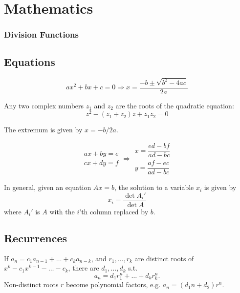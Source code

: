 
\chapter{Mathematics}
\subsection{Division Functions}

\section{Equations}
\[ax^2+bx+c=0 \Rightarrow x = \frac{-b\pm\sqrt{b^2-4ac}}{2a}\]

Any two complex numbers $z_1$ and $z_2$ are the roots of the quadratic equation:
\[z^2 - (z_1 + z_2)z + z_1 z_2 = 0\]

The extremum is given by $x = -b/2a$.

\[\begin{aligned}ax+by=e\\cx+dy=f\end{aligned}
\Rightarrow
\begin{aligned}x=\dfrac{ed-bf}{ad-bc}\\y=\dfrac{af-ec}{ad-bc}\end{aligned}\]

In general, given an equation $Ax = b$, the solution to a variable $x_i$ is given by
\[x_i = \frac{\det A_i'}{\det A} \]
where $A_i'$ is $A$ with the $i$'th column replaced by $b$.

\section{Recurrences}
If $a_n = c_1 a_{n-1} + \dots + c_k a_{n-k}$, and $r_1, \dots, r_k$ are distinct roots of $x^k - c_1 x^{k-1} - \dots - c_k$, there are $d_1, \dots, d_k$ s.t.
\[a_n = d_1r_1^n + \dots + d_kr_k^n. \]
Non-distinct roots $r$ become polynomial factors, e.g. $a_n = (d_1n + d_2)r^n$.

